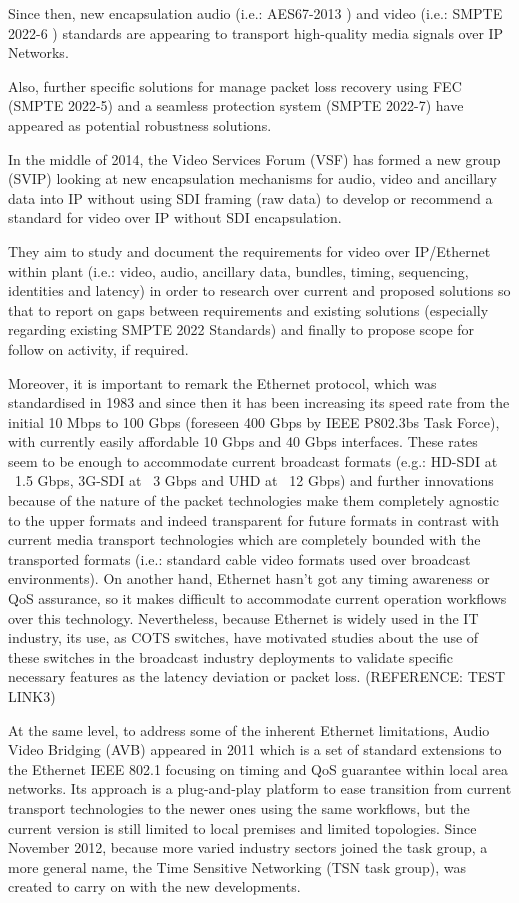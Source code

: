 Since then, new encapsulation audio (i.e.: AES67-2013 \cite{AES}) and video (i.e.: SMPTE 2022-6 \cite{ST2022}) standards are appearing to transport high-quality media signals over IP Networks.

Also, further specific solutions for manage packet loss recovery using FEC (SMPTE 2022-5) and a seamless protection system (SMPTE 2022-7) have appeared as potential robustness solutions.

In the middle of 2014, the Video Services Forum (VSF) has formed a new group (SVIP) looking at new encapsulation mechanisms for audio, video and ancillary data into IP without using SDI framing (raw data) to develop or recommend a standard for video over IP without SDI encapsulation.

They aim to study and document the requirements for video over IP/Ethernet within plant (i.e.: video, audio, ancillary data, bundles, timing, sequencing, identities and latency) in order to research over current and proposed solutions so that to report on gaps between requirements and existing solutions (especially regarding existing SMPTE 2022 Standards) and finally to propose scope for follow on activity, if required.

Moreover, it is important to remark the Ethernet protocol, which was standardised in 1983 and since then it has been increasing its speed rate from the initial 10 Mbps to 100 Gbps (foreseen 400 Gbps by IEEE P802.3bs Task Force), with currently easily affordable 10 Gbps and 40 Gbps interfaces. These rates seem to be enough to accommodate current broadcast formats (e.g.: HD-SDI at ~1.5 Gbps, 3G-SDI at ~3 Gbps and UHD at ~12 Gbps) and further innovations because of the nature of the packet technologies make them completely agnostic to the upper formats and indeed transparent for future formats in contrast with current media transport technologies which are completely bounded with the transported formats (i.e.: standard cable video formats used over broadcast environments). On another hand, Ethernet hasn't got any timing awareness or QoS assurance, so it makes difficult to accommodate current operation workflows over this technology. Nevertheless, because Ethernet is widely used in the IT industry, its use, as COTS switches, have motivated studies about the use of these switches in the broadcast industry deployments to validate specific necessary features as the latency deviation or packet loss. (REFERENCE: TEST LINK3)

At the same level, to address some of the inherent Ethernet limitations, Audio Video Bridging (AVB) appeared in 2011 which is a set of standard extensions to the Ethernet IEEE 802.1 focusing on timing and QoS guarantee within local area networks. Its approach is a plug-and-play platform to ease transition from current transport technologies to the newer ones using the same workflows, but the current version is still limited to local premises and limited topologies. Since November 2012, because more varied industry sectors joined the task group, a more general name, the Time Sensitive Networking (TSN task group), was created to carry on with the new developments.

